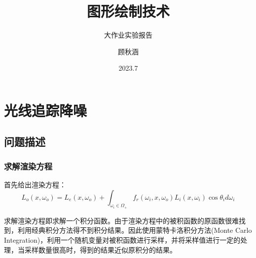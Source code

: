 \documentclass[lang=cn,10pt]{elegantbook}
\title{图形绘制技术}
\subtitle{大作业实验报告}
\date{2023.7}
\institute{南京大学计算机科学与技术系}
\author{顾秋涵}
\begin{document}
\maketitle
\frontmatter

\tableofcontents

\mainmatter

\chapter{光线追踪降噪}
\section{问题描述}
\subsection{求解渲染方程}
首先给出渲染方程：
\begin{equation}\label{eu_eqn}
L_o(x,\omega_o)=L_e(x,\omega_o)+\int_{\omega_i\in\Omega_+}f_r(\omega_i,x,\omega_o)L_i(x,\omega_i)\cos\theta_id\omega_i
\end{equation}


求解渲染方程即求解一个积分函数。由于渲染方程中的被积函数的原函数很难找到，利用经典积分方法得不到积分结果。因此使用蒙特卡洛积分方法(Monte Carlo Integration)，利用一个随机变量对被积函数进行采样，并将采样值进行一定的处理，当采样数量很高时，得到的结果近似原积分的结果。
\end{document}
